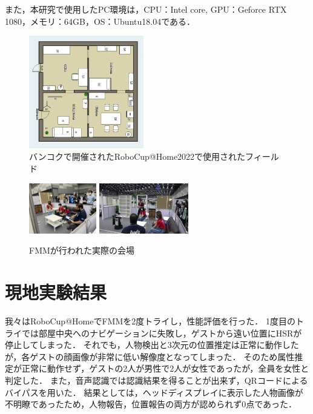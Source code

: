 \documentclass[a4j]{jarticle}
\begin{document}
また，本研究で使用したPC環境は，CPU：Intel core, GPU：Geforce RTX 1080，メモリ：64GB，OS：Ubuntu18.04である．
\begin{figure}[ht]
  \centering
  \includegraphics[width=5cm]{images/robocup/arenaBangkok_rotate.png}
  \caption{バンコクで開催されたRoboCup@Home2022で使用されたフィールド}
  \label{robocup_field}
\end{figure}
\begin{figure}[ht]
  \centering
  \includegraphics[height=2.2cm]{images/robocup/FMM_onsite_overview_1.jpg}
  \includegraphics[height=2.2cm]{images/robocup/FMM_onsite_overview_3.jpg}
  \caption{FMMが行われた実際の会場}
  \label{onsite_overview_1}
\end{figure}


\section{現地実験結果}
我々はRoboCup@HomeでFMMを2度トライし，性能評価を行った．
1度目のトライでは部屋中央へのナビゲーションに失敗し，ゲストから遠い位置にHSRが停止してしまった．
それでも，人物検出と3次元の位置推定は正常に動作したが，各ゲストの顔画像が非常に低い解像度となってしまった．
そのため属性推定が正常に動作せず，ゲストの2人が男性で2人が女性であったが，全員を女性と判定した．
また，音声認識では認識結果を得ることが出来ず，QRコードによるバイパスを用いた．
結果としては，ヘッドディスプレイに表示した人物画像が不明瞭であったため，人物報告，位置報告の両方が認められず0点であった．
\end{document}
